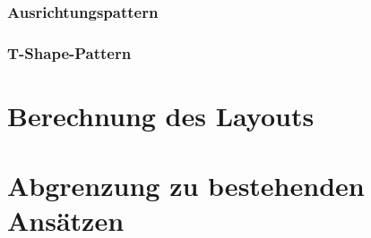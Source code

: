 \subsubsection{Ausrichtungspattern}
\subsubsection{T-Shape-Pattern}


\section{Berechnung des Layouts}
\label{sec:layout-calculation}


\section{Abgrenzung zu bestehenden Ansätzen}
\label{sec:current-approaches-comparison}

\endinput 

\subsection{Bearbeitungsaktionen}
\label{subsec:edit-actions}

Alle interaktiven Ansätze für das Layout von Diagrammen aus dem Kapitel \ref{chapter:existing-approaches} bis auf das \enquote{Smart Layout} in MindNode (siehe Abschnitt \ref{subsubsec:smart-layout-in-mindnode}) unterstützen die \textbf{freie Positionierung} der Objekte im Diagramm. Diese Art der Bedienung wird im manuellen Layout zusätzlich um temporäre Hilfefunktionen (siehe Abschnitt \ref{sec:manual-layout}) und in Struktur-basierten benutzergesteuerten Ansätzen um Möglichkeit der Erzeugung von Strukturregeln (siehe Abschnitt \ref{subsec:structure-based-user-controlled-approaches}) erweitert. Durch diese Erweiterungen wird die freie Positionierung eingeschränkt, dass in der Regel zu einem besseren Layout des Diagramms führt. Dahingegen ist die freie Positionierung in \enquote{Smart Layout} in MindNode und dem in dieser Arbeit präsentierten Ansatz \textbf{nicht gestattet}. Somit bewirkt die Verschiebung eines Objekts im Diagramm keine direkte Anpassung seiner Position, sondern wird als eine Äußerung der gewünschten Position interpretiert.

